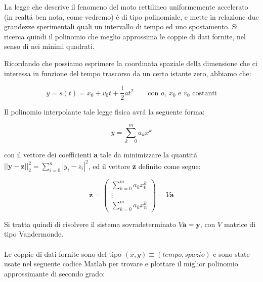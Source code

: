 \begin{center}
\footnotesize\noindent{}\end{center}

\noindent La legge che descrive il fenomeno del moto rettilineo uniformemente accelerato (in realt\'a ben nota, come vedremo) \'e di tipo polinomiale, e mette in relazione due grandezze sperimentali quali un intervallo di tempo ed uno spostamento. Si ricerca quindi il polinomio che meglio approssima le coppie di dati fornite, nel senso di nei minimi quadrati. 

\noindent Ricordando che possiamo esprimere la coordinata spaziale della dimensione che ci interessa in funzione del tempo trascorso da un certo istante zero, abbiamo che:

\[
  y =  s(t) = x_0 + v_0t + \frac{1}{2}at^2 \quad \quad \text{con } a \text{, } x_0 \text{ e } v_0 \text{ costanti}
\]

\noindent Il polinomio interpolante tale legge fisica avr\'a la seguente forma:

\[
  y = \sum^m_{k=0}a_kx^k
\]

\noindent con il vettore dei coefficienti \textbf{a} tale da minimizzare la quantit\'a \(||\textbf{y}-\textbf{z}||^2_2 = \sum^n_{i=0}|y_i-z_i|^2\), ed il vettore \textbf{z} definito come segue:

\[
  \textbf{z} = \begin{pmatrix} \sum_{k=0}^m a_kx_0^k \\ \vdots \\  \sum_{k=0}^m a_kx_n^k \end{pmatrix} = V \textbf{a}
\]

\noindent Si tratta quindi di risolvere il sistema sovradeterminato \(V \textbf{a} = \textbf{y} \), con \(V\) matrice di tipo Vandermonde.
\\ \\
\noindent Le coppie di dati fornite sono del tipo \((x, y) \equiv  (tempo, spazio)\) e sono state usate nel seguente codice Matlab per trovare e plottare il miglior polinomio approssimante di secondo grado:

